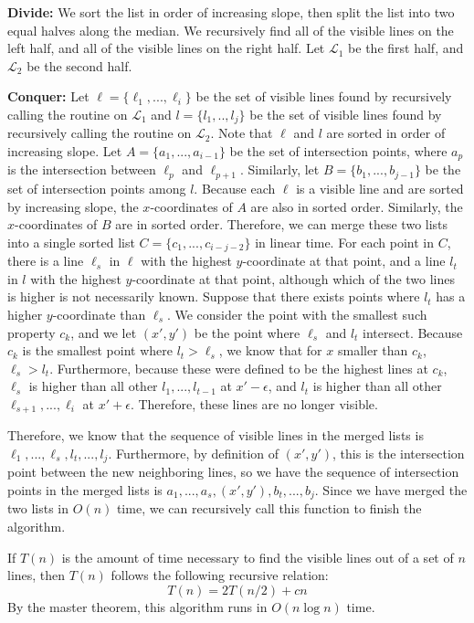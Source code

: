 \documentclass[oneside, 12pt]{article}
\begin{document}
\begin{enumerate}
\textbf{Divide:} We sort the list in order of increasing slope, then split the list into two equal halves along the median. We recursively find all of the visible lines on the left half, and all of the visible lines on the right half. Let $\mathcal{L}_1$ be the first half, and $\mathcal{L}_2$ be the second half. 

\textbf{Conquer:} Let $\ell = \{\ell_1,...,\ell_i \}$ be the set of visible lines found by recursively calling the routine on $\mathcal{L}_1$ and $l = \{l_1,..,l_j\}$ be the set of visible lines found by recursively calling the routine on $\mathcal{L}_2$. Note that $\ell$ and $l$ are sorted in order of increasing slope. Let $A = \{a_1,...,a_{i-1} \}$ be the set of intersection points, where $a_p$ is the intersection between $\ell_p$ and $\ell_{p+1}$. Similarly, let $B = \{b_1,...,b_{j-1}\}$ be the set of intersection points among $l$. Because each $\ell$ is a visible line and are sorted by increasing slope, the $x$-coordinates of $A$ are also in sorted order. Similarly, the $x$-coordinates of $B$ are in sorted order. Therefore, we can merge these two lists into a single sorted list $C = \{c_1,...,c_{i-j-2} \}$ in linear time. For each point in $C$, there is a line $\ell_s$ in $\ell$ with the highest $y$-coordinate at that point, and a line $l_t$ in $l$ with the highest $y$-coordinate at that point, although which of the two lines is higher is not necessarily known. Suppose that there exists points where $l_t$ has a higher $y$-coordinate than $\ell_s$. We consider the point with the smallest such property $c_k$, and we let $(x', y')$ be the point where $\ell_s$ and $l_t$ intersect. Because $c_k$ is the smallest point where $l_t > \ell_s$, we know that for $x$ smaller than $c_k$, $\ell_s > l_t$. Furthermore, because these were defined to be the highest lines at $c_k$, $\ell_s$ is higher than all other $l_{1},...,l_{t-1}$ at $x' - \epsilon$, and $l_t$ is higher than all other $\ell_{s+1},...,\ell_i$ at $x' + \epsilon$. Therefore, these lines are no longer visible. 

Therefore, we know that the sequence of visible lines in the merged lists is $\ell_1,...,\ell_s,l_t,...,l_j$. Furthermore, by definition of $(x',y')$, this is the intersection point between the new neighboring lines, so we have the sequence of intersection points in the merged lists is $a_1,...,a_s,(x',y'),b_t,...,b_j$. Since we have merged the two lists in $O(n)$ time, we can recursively call this function to finish the algorithm.

If $T(n)$ is the amount of time necessary to find the visible lines out of a set of $n$ lines, then $T(n)$ follows the following recursive relation:
\[
T(n) = 2T(n/2) + cn
\]
By the master theorem, this algorithm runs in $O(n \log n)$ time. 
\end{enumerate}
\end{document}
